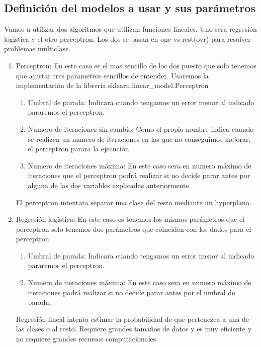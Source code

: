 \documentclass[titlepage]{article}
\begin{document}
\subsection{Definición del modelos a usar y sus parámetros}
Vamos a utilizar dos algoritmos que utilizan funciones lineales. Uno sera regresión logistica y el otro perceptron. Los dos se basan en one vs rest(ovr) para resolver problemas multiclase.
\begin{enumerate}
	\item{Perceptron}: En este caso es el mas sencillo de los dos puesto que solo tenemos que ajustar tres parametros sencillos de entender. Usaremos la implementación de la librería sklearn.linear\_model.Perceptron
	\begin{enumerate}		
		\item{Umbral de parada:} Indicara cuando tengamos un error menor al indicado pararemos el perceptron.
		\item{Numero de iteraciones sin cambio:} Como el propio nombre indica cuando se realizen un numero de iteraciones en las que no conseguimos mejorar, el perceptron parara la ejecución.
		\item{Numero de iteraciones máxima:} En este caso sera en numero máximo de iteraciones que el perceptron  podrá realizar si no decide parar antes por alguna de las dos variables explicadas anteriormente.
	\end{enumerate}
	El perceptron intentara separar una clase del resto mediante un hyperplano. 
	
	\item{Regresión logística:} En este caso es tenemos los mismos parámetros que el perceptron solo tenemos dos parámetros que coinciden con los dados para el perceptron.
	\begin{enumerate}		
		\item{Umbral de parada:} Indicara cuando tengamos un error menor al indicado pararemos el perceptron.
		\item{Numero de iteraciones máxima:} En este caso sera en numero máximo de iteraciones podrá realizar si no decide parar antes por el umbral de parada.
	\end{enumerate}
	Regresión lineal intenta estimar la probabilidad de que pertenezca a una de las clases o al resto. Requiere grandes tamaños de datos y es muy eficiente y no requiere grandes recursos computacionales.
\end{enumerate}
\end{document}
